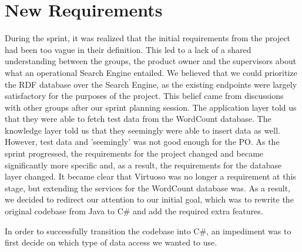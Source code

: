 \section{New Requirements} \label{ssec:newRequirements}
During the sprint, it was realized that the initial requirements from the \knox{} project had been too vague in their definition. 
This led to a lack of a shared understanding between the groups, the product owner and the supervisors about what an operational Search Engine entailed.  
We believed that we could prioritize the RDF database over the Search Engine, as the existing endpoints were largely satisfactory for the purposes of the project. This belief came from discussions with other groups after our sprint planning session. The application layer told us that they were able to fetch test data from the WordCount database. The knowledge layer told us that they seemingly were able to insert data as well.
However, test data and 'seemingly' was not good enough for the \knox{} PO.
As the sprint progressed, the requirements for the \knox{} project changed and became significantly more specific and, as a result, the requirements for the database layer changed.
It became clear that Virtuoso was no longer a requirement at this stage, but extending the services for the WordCount database was.
As a result, we decided to redirect our attention to our initial goal, which was to rewrite the original codebase from Java to C\# and add the required extra features.

In order to successfully transition the codebase into C\#, an impediment was to first decide on which type of data access we wanted to use.
